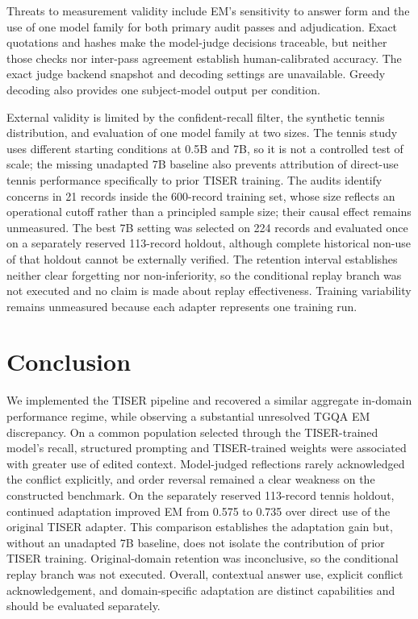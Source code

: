 \documentclass[conference]{IEEEtran}
\begin{document}
Threats to measurement validity include EM's sensitivity to answer form and the use of one model family for both primary audit passes and adjudication. Exact quotations and hashes make the model-judge decisions traceable, but neither those checks nor inter-pass agreement establish human-calibrated accuracy. The exact judge backend snapshot and decoding settings are unavailable. Greedy decoding also provides one subject-model output per condition.

External validity is limited by the confident-recall filter, the synthetic tennis distribution, and evaluation of one model family at two sizes. The tennis study uses different starting conditions at 0.5B and 7B, so it is not a controlled test of scale; the missing unadapted 7B baseline also prevents attribution of direct-use tennis performance specifically to prior TISER training. The audits identify concerns in 21 records inside the 600-record training set, whose size reflects an operational cutoff rather than a principled sample size; their causal effect remains unmeasured. The best 7B setting was selected on 224 records and evaluated once on a separately reserved 113-record holdout, although complete historical non-use of that holdout cannot be externally verified. The retention interval establishes neither clear forgetting nor non-inferiority, so the conditional replay branch was not executed and no claim is made about replay effectiveness. Training variability remains unmeasured because each adapter represents one training run.

\section{Conclusion}

We implemented the TISER pipeline and recovered a similar aggregate in-domain performance regime, while observing a substantial unresolved TGQA EM discrepancy. On a common population selected through the TISER-trained model's recall, structured prompting and TISER-trained weights were associated with greater use of edited context. Model-judged reflections rarely acknowledged the conflict explicitly, and order reversal remained a clear weakness on the constructed benchmark. On the separately reserved 113-record tennis holdout, continued adaptation improved EM from 0.575 to 0.735 over direct use of the original TISER adapter. This comparison establishes the adaptation gain but, without an unadapted 7B baseline, does not isolate the contribution of prior TISER training. Original-domain retention was inconclusive, so the conditional replay branch was not executed. Overall, contextual answer use, explicit conflict acknowledgement, and domain-specific adaptation are distinct capabilities and should be evaluated separately.
\end{document}
